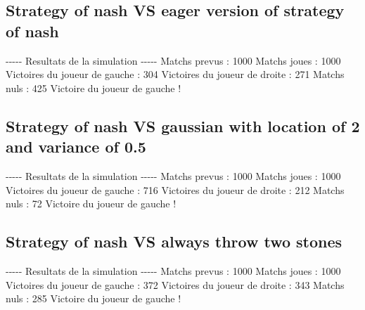 \documentclass{article}%
\begin{document}
%
\subsection{Strategy of nash VS eager version of strategy of nash}%
\label{subsec:Strategy of nash VS eager version of strategy of nash}%
{-}{-}{-}{-}{-} Resultats de la simulation {-}{-}{-}{-}{-}\newline%
		\newline%
Matchs prevus : 1000\newline%
Matchs joues : 1000\newline%
\newline%
Victoires du joueur de gauche : 304\newline%
Victoires du joueur de droite : 271\newline%
Matchs nuls : 425\newline%
\newline%
Victoire du joueur de gauche !

%
\subsection{Strategy of nash VS gaussian with location of 2 and variance of 0.5}%
\label{subsec:Strategy of nash VS gaussian with location of 2 and variance of 0.5}%
{-}{-}{-}{-}{-} Resultats de la simulation {-}{-}{-}{-}{-}\newline%
		\newline%
Matchs prevus : 1000\newline%
Matchs joues : 1000\newline%
\newline%
Victoires du joueur de gauche : 716\newline%
Victoires du joueur de droite : 212\newline%
Matchs nuls : 72\newline%
\newline%
Victoire du joueur de gauche !

%
\subsection{Strategy of nash VS always throw two stones}%
\label{subsec:Strategy of nash VS always throw two stones}%
{-}{-}{-}{-}{-} Resultats de la simulation {-}{-}{-}{-}{-}\newline%
		\newline%
Matchs prevus : 1000\newline%
Matchs joues : 1000\newline%
\newline%
Victoires du joueur de gauche : 372\newline%
Victoires du joueur de droite : 343\newline%
Matchs nuls : 285\newline%
\newline%
Victoire du joueur de gauche !
\end{document}
